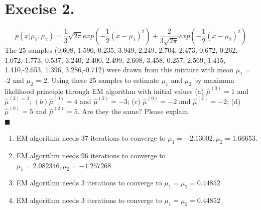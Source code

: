 \documentclass{article}
\newcommand{\solution}[1]{~\\ $\blacksquare$ \sffamily\upshape\selectfont #1
\normalfont ~\\~ }
\begin{document}
\section{Execise 2.}
\[ p(x|\mu_1,\mu_2)=\frac{1}{3}\sqrt{2\pi}exp(-\frac{1}{2}(x-\mu_1)^2) +
\frac{2}{3\sqrt{2\pi}}exp(-\frac{1}{2}(x-\mu_2)^2) \]
The 25 samples (0.608,-1.590, 0.235, 3.949,-2.249, 2.704,-2.473,
0.672, 0.262, 1.072,-1.773, 0.537, 3.240, 2.400,-2.499, 2.608,-3.458,
0.257, 2.569, 1.415, 1.410,-2.653, 1.396, 3.286,-0.712) were drawn
from this mixture with mean $\mu_1$ = -2 and $\mu_2$ = 2. Using these
25 samples to estimate $\mu_1$ and $\mu_2$ by maximum likelihood
principle through EM algorithm with initial values (a)
$\hat{\mu}^{(0)} = 1$ and $\hat{\mu}^{(2)=3}$; $(b)\hat{\mu}^{(0)} =
4$ and $\hat{\mu}^{(2)} = -3$; (c) $\hat{\mu}^{(0)} = -2$ and
$\hat{\mu}^{(2)} = -2$; (d) $\hat{\mu}^{(0)} = 5$ and $\hat{\mu}^{(2)}
= 5$. Are they the same? Please explain.
\solution{
\begin{enumerate}
\item EM algorithm needs 37 iterations to converge to $\mu_1 =
  -2.13002, \mu_2 = 1.66653$. 
\item EM algorithm needs 96 iterations to converge to $\mu_1 = 2.082346, \mu_2 = -1.257268$
\item EM algorithm needs 3 iterations to converge to $\mu_1 = \mu_2 = 0.44852$
\item EM algorithm needs 3 iterations to converge to $\mu_1 = \mu_2 = 0.44852$
\end{enumerate}
}
\end{document}
